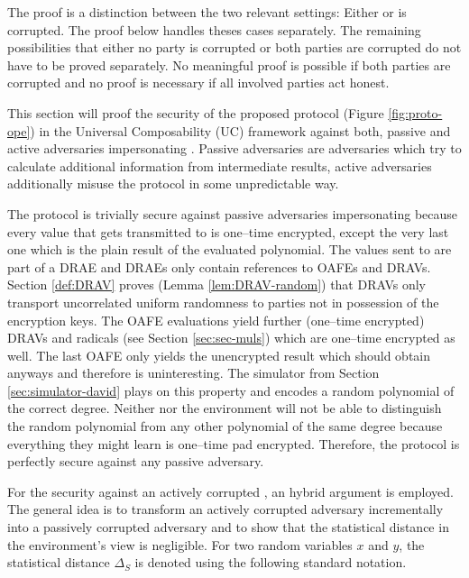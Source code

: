 %
%
\label{sec:proof}

The proof is a distinction between the two relevant settings: Either \JWpOne{}
or \JWpTwo{} is corrupted. The proof below handles theses cases separately. The
remaining possibilities that either no party is corrupted or both parties are
corrupted do not have to be proved separately. No meaningful proof is possible
if both parties are corrupted and no proof is necessary if all involved parties
act honest.



This section will proof the security of the proposed protocol \JWprotoSymOPE
(Figure \ref{fig:proto-ope}) in the Universal Composability (UC) framework
\cite{canetti05} against both, passive and active adversaries impersonating
\JWpTwo{}. Passive adversaries are adversaries which try to calculate additional
information from intermediate results, active adversaries additionally misuse
the protocol in some unpredictable way.

The protocol is trivially secure against passive adversaries impersonating
\JWpTwo{} because every value that gets transmitted to \JWpTwo{} is one--time
encrypted, except the very last one which is the plain result of the evaluated
polynomial. The values sent to \JWpTwo{} are part of a DRAE and DRAEs only
contain references to OAFEs and DRAVs. Section \ref{def:DRAV} proves (Lemma
\ref{lem:DRAV-random}) that DRAVs only transport uncorrelated uniform randomness
to parties not in possession of the encryption keys. The OAFE evaluations yield
further (one--time encrypted) DRAVs and radicals (see Section
\ref{sec:sec-muls}) which are one--time encrypted as well. The last OAFE only
yields the unencrypted result which \JWpTwo{} should obtain anyways and
therefore is uninteresting. The simulator from Section \ref{sec:simulator-david}
plays on this property and encodes a random polynomial of the correct degree.
Neither \JWpTwo{} nor the environment will not be able to distinguish the random
polynomial from any other polynomial of the same degree because everything they
might learn is one--time pad encrypted. Therefore, the protocol is perfectly
secure against any passive adversary.

For the security against an actively corrupted \JWpTwo{}, an hybrid argument is
employed. The general idea is to transform an actively corrupted adversary
incrementally into a passively corrupted adversary and to show that the
statistical distance in the environment's view is negligible. For two random
variables $x$ and $y$, the statistical distance $\Delta_S$ is denoted using the
following standard notation.

